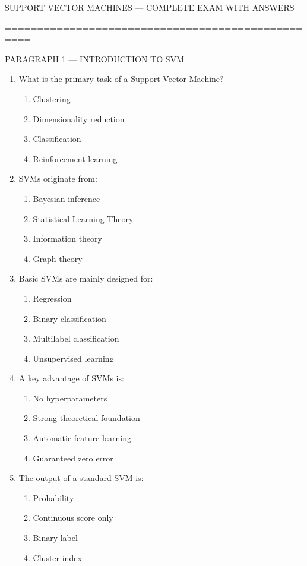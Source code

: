 \documentclass{article}
\begin{document}
	
	SUPPORT VECTOR MACHINES — COMPLETE EXAM WITH ANSWERS
	
	\bigskip
	==================================================
	
	PARAGRAPH 1 — INTRODUCTION TO SVM
	
	\begin{enumerate}
		\item What is the primary task of a Support Vector Machine?
		\begin{enumerate}
			\item Clustering
			\item Dimensionality reduction
			\item Classification
			\item Reinforcement learning
		\end{enumerate}
		
		\item SVMs originate from:
		\begin{enumerate}
			\item Bayesian inference
			\item Statistical Learning Theory
			\item Information theory
			\item Graph theory
		\end{enumerate}
		
		\item Basic SVMs are mainly designed for:
		\begin{enumerate}
			\item Regression
			\item Binary classification
			\item Multilabel classification
			\item Unsupervised learning
		\end{enumerate}
		
		\item A key advantage of SVMs is:
		\begin{enumerate}
			\item No hyperparameters
			\item Strong theoretical foundation
			\item Automatic feature learning
			\item Guaranteed zero error
		\end{enumerate}
		
		\item The output of a standard SVM is:
		\begin{enumerate}
			\item Probability
			\item Continuous score only
			\item Binary label
			\item Cluster index
		\end{enumerate}
	\end{enumerate}
	
\end{document}
